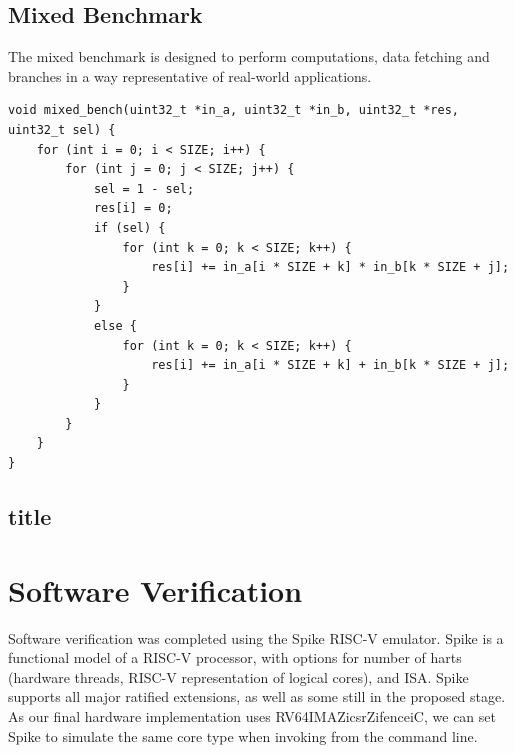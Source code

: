 \subsection{Mixed Benchmark}
The mixed benchmark is designed to perform computations, data fetching and branches in a way representative of real-world applications.

\begin{verbatim}
void mixed_bench(uint32_t *in_a, uint32_t *in_b, uint32_t *res, uint32_t sel) {
    for (int i = 0; i < SIZE; i++) {
        for (int j = 0; j < SIZE; j++) {
            sel = 1 - sel;
            res[i] = 0;
            if (sel) {
                for (int k = 0; k < SIZE; k++) {
                    res[i] += in_a[i * SIZE + k] * in_b[k * SIZE + j];
                }
            }
            else {
                for (int k = 0; k < SIZE; k++) {
                    res[i] += in_a[i * SIZE + k] + in_b[k * SIZE + j];
                }
            }
        }
    }
}
\end{verbatim}

\subsection{title}
\section{Software Verification}
Software verification was completed using the Spike RISC-V emulator. Spike is a functional model of a RISC-V processor, with options for number of harts (hardware threads, RISC-V representation of logical cores), and ISA. Spike supports all major ratified extensions, as well as some still in the proposed stage. As our final hardware implementation uses RV64IMAZicsrZifenceiC, we can set Spike to simulate the same core type when invoking from the command line.

